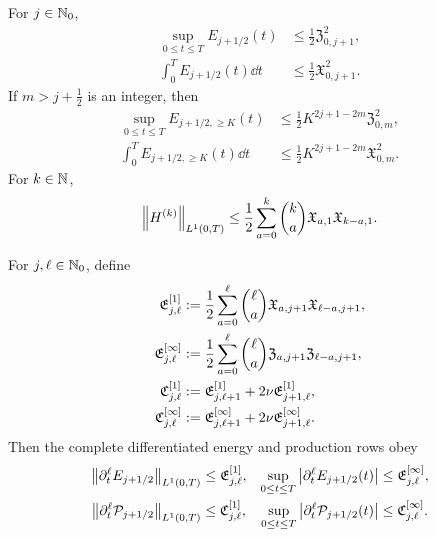 {\begin{theorem}
For \(j\in\mathbb N_0\),
\begin{align}
 \sup_{0\le t\le T}E_{j+1/2}(t)
 &\le\frac12\mathfrak Z_{0,j+1}^2,
 \label{u:eq:qc-sharp-critical-sup}\\
 \int_0^TE_{j+1/2}(t)\dd t
 &\le\frac12\mathfrak X_{0,j+1}^2.
 \label{u:eq:qc-sharp-critical-mass}
\end{align}
If \(m>j+\frac12\) is an integer, then
\begin{align}
 \sup_{0\le t\le T}E_{j+1/2,\ge K}(t)
 &\le\frac12K^{2j+1-2m}\mathfrak Z_{0,m}^2,
 \label{u:eq:qc-sharp-critical-tail-sup}\\
 \int_0^TE_{j+1/2,\ge K}(t)\dd t
 &\le\frac12K^{2j+1-2m}\mathfrak X_{0,m}^2.
 \label{u:eq:qc-sharp-critical-tail-mass}
\end{align}
For \(k\in\mathbb N\),
\begin{equation}
 \left\lVert H^{(k)}\right\rVert_{L^1(0,T)}
 \le\frac12\sum_{a=0}^{k}\binom ka
 \mathfrak X_{a,1}\mathfrak X_{k-a,1}.
 \label{u:eq:qc-sharp-height-derivatives}
\end{equation}
\begin{samepage}
For \(j,\ell\in\mathbb N_0\), define
\begin{align}
 \mathfrak E_{j,\ell}^{[1]}
 &:=\frac12\sum_{a=0}^{\ell}\binom\ell a
 \mathfrak X_{a,j+1}\mathfrak X_{\ell-a,j+1},
 \notag\\
 \mathfrak E_{j,\ell}^{[\infty]}
 &:=\frac12\sum_{a=0}^{\ell}\binom\ell a
 \mathfrak Z_{a,j+1}\mathfrak Z_{\ell-a,j+1},
 \label{u:eq:qc-height-row-majorants}\\
 \mathfrak C_{j,\ell}^{[1]}
 &:=\mathfrak E_{j,\ell+1}^{[1]}
    +2\nu\mathfrak E_{j+1,\ell}^{[1]},
 \notag\\
 \mathfrak C_{j,\ell}^{[\infty]}
 &:=\mathfrak E_{j,\ell+1}^{[\infty]}
    +2\nu\mathfrak E_{j+1,\ell}^{[\infty]}.
 \label{u:eq:qc-production-row-majorants}
\end{align}
Then the complete differentiated energy and production rows obey
\begin{align}
 \left\lVert \partial_t^\ell E_{j+1/2}\right\rVert_{L^1(0,T)}
 &\le\mathfrak E_{j,\ell}^{[1]},
 &
 \sup_{0\le t\le T}
 \left|\partial_t^\ell E_{j+1/2}(t)\right|
 &\le\mathfrak E_{j,\ell}^{[\infty]},
 \label{u:eq:qc-sharp-energy-row-family}\\
 \left\lVert \partial_t^\ell\mathcal P_{j+1/2}\right\rVert_{L^1(0,T)}
 &\le\mathfrak C_{j,\ell}^{[1]},
 &
 \sup_{0\le t\le T}
 \left|\partial_t^\ell\mathcal P_{j+1/2}(t)\right|
 &\le\mathfrak C_{j,\ell}^{[\infty]}.
 \label{u:eq:qc-sharp-production-row-family}
\end{align}
\end{samepage}

\end{theorem}}
